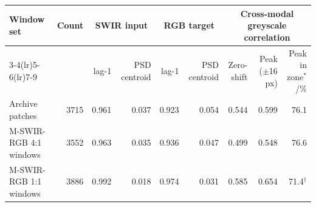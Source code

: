 \begin{tabular}{@{}lrrrrrrrr@{}}
\toprule
Window set & Count & \multicolumn{2}{c}{SWIR input} & \multicolumn{2}{c}{RGB target} & \multicolumn{3}{c}{Cross-modal greyscale correlation}\\
\cmidrule(lr){3-4}\cmidrule(lr){5-6}\cmidrule(lr){7-9}
 & & lag-1 & PSD centroid & lag-1 & PSD centroid & Zero-shift & Peak ($\pm$16 px) & Peak in zone$^{*}$/\%\\
\midrule
Archive patches~\cite{chen2026thesis} & 3715 & 0.961 & 0.037 & 0.923 & 0.054 & 0.544 & 0.599 & 76.1 \\
M-SWIR-RGB 4:1 windows & 3552 & 0.963 & 0.035 & 0.936 & 0.047 & 0.499 & 0.548 & 76.6 \\
M-SWIR-RGB 1:1 windows & 3886 & 0.992 & 0.018 & 0.974 & 0.031 & 0.585 & 0.654 & 71.4$^{\dagger}$ \\
\bottomrule
\end{tabular}
